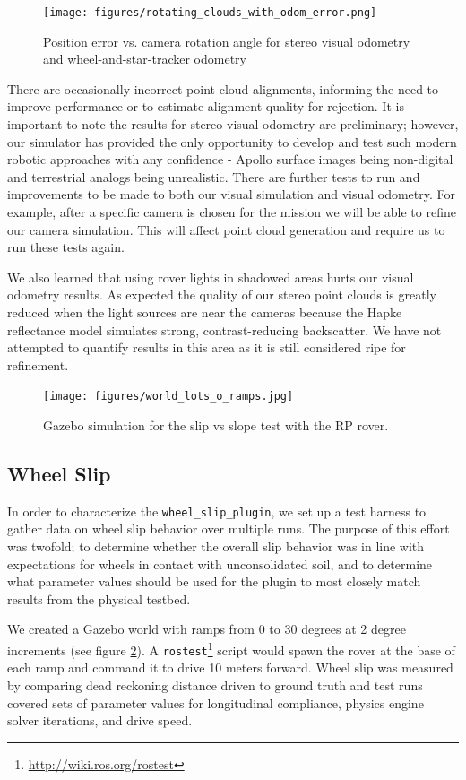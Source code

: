 \documentclass[twocolumn,letterpaper]{IEEEAerospaceCLS}  %
\begin{document}
\begin{figure}[h!]
	\texttt{[image: figures/rotating\_clouds\_with\_odom\_error.png]}
    \caption{Position error vs.  camera rotation angle for stereo visual odometry and wheel-and-star-tracker odometry}
    \label{fig:odom_error}
\end{figure}

There are occasionally incorrect point cloud alignments, informing the need to improve performance or to estimate alignment quality for rejection.
It is important to note the results for stereo visual odometry are preliminary; however, our simulator has provided the only opportunity to develop and test such modern robotic approaches with any confidence - Apollo surface images being non-digital and terrestrial analogs being unrealistic.  
There are further tests to run and improvements to be made to both our visual simulation and visual odometry.  
For example, after a specific camera is chosen for the mission we will be able to refine our camera simulation.  
This will affect point cloud generation and require us to run these tests again.

We also learned that using rover lights in shadowed areas hurts our visual odometry results.  
As expected the quality of our stereo point clouds is greatly reduced when the light sources are near the cameras because the Hapke reflectance model simulates strong, contrast-reducing backscatter.  
We have not attempted to quantify results in this area as it is still considered ripe for refinement.

\begin{figure}[htp!]
	\texttt{[image: figures/world\_lots\_o\_ramps.jpg]}
   	\caption{Gazebo simulation for the slip vs slope test with the RP rover.}
    \label{fig:simulationramps}
\end{figure}
\subsection{Wheel Slip}

In order to characterize the \texttt{wheel\_slip\_plugin}, we set up a test harness to gather data on wheel slip behavior over multiple runs.  
The purpose of this effort was twofold; to determine whether the overall slip behavior was in line with expectations for wheels in contact with unconsolidated soil, and to determine what parameter values should be used for the plugin to most closely match results from the physical testbed.  

We created a Gazebo world with ramps from 0 to 30 degrees at 2 degree increments (see figure \ref{fig:simulationramps}).  
A \texttt{rostest}\footnote{\url{http://wiki.ros.org/rostest}} script would spawn the rover at the base of each ramp and command it to drive 10 meters forward.
Wheel slip was measured by comparing dead reckoning distance driven to ground truth and test runs covered sets of parameter values for longitudinal compliance, physics engine solver iterations, and drive speed.  
\end{document}
